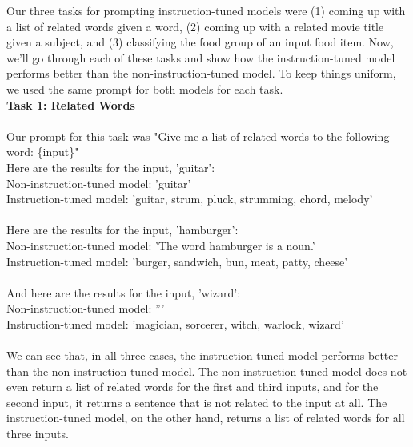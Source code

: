 \documentclass{article}
\begin{document}
Our three tasks for prompting instruction-tuned models were (1) coming up with a list of related words given a word, (2) coming up with a related movie title given a subject, and (3) classifying the food group of an input food item. Now, we'll go through each of these tasks and show how the instruction-tuned model performs better than the non-instruction-tuned model. To keep things uniform, we used the same prompt for both models for each task.\\

\textbf{Task 1: Related Words}\\\\
Our prompt for this task was "Give me a list of related words to the following word: \{input\}"\\
\indent Here are the results for the input, 'guitar':\\
\indent \indent Non-instruction-tuned model: 'guitar'\\
\indent \indent Instruction-tuned model: 'guitar, strum, pluck, strumming, chord, melody'\\\\
\indent Here are the results for the input, 'hamburger':\\
\indent \indent Non-instruction-tuned model: 'The word hamburger is a noun.'\\
\indent \indent Instruction-tuned model: 'burger, sandwich, bun, meat, patty, cheese'\\\\
\indent And here are the results for the input, 'wizard':\\
\indent \indent Non-instruction-tuned model: '''\\
\indent \indent Instruction-tuned model: 'magician, sorcerer, witch, warlock, wizard'\\\\
We can see that, in all three cases, the instruction-tuned model performs better than the non-instruction-tuned model. The non-instruction-tuned model does not even return a list of related words for the first and third inputs, and for the second input, it returns a sentence that is not related to the input at all. The instruction-tuned model, on the other hand, returns a list of related words for all three inputs.\\
\end{document}

